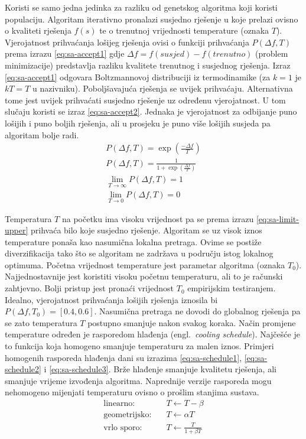 \documentclass[times, utf8, diplomski]{fer}
\begin{document}
Koristi se samo jedna jedinka za razliku od genetskog algoritma koji koristi populaciju. Algoritam iterativno pronalazi susjedno rješenje u koje prelazi ovisno o kvaliteti rješenja $f(s)$ te o trenutnoj vrijednosti temperature (oznaka $T$). Vjerojatnost prihvaćanja lošijeg rješenja ovisi o funkciji prihvaćanja $P(\Delta f, T)$ prema izrazu \ref{eq:sa-accept1} gdje $\Delta f=f(susjed)-f(trenutno)$ (problem minimizacije) predstavlja razliku kvalitete trenutnog i susjednog rješenja. Izraz \ref{eq:sa-accept1} odgovara Boltzmannovoj distribuciji iz termodinamike (za $k=1$ je $kT=T$ u nazivniku). Poboljšavajuća rješenja se uvijek prihvaćaju. Alternativna tome jest uvijek prihvaćati susjedno rješenje uz određenu vjerojatnost. U tom slučaju koristi se izraz \ref{eq:sa-accept2}. Jednaka je vjerojatnost za odbijanje puno lošijih i puno boljih rješenja, ali u prosjeku je puno više lošijih susjeda pa algoritam bolje radi.
%
\begin{gather}
	\label{eq:sa-accept1}
	P(\Delta f, T)=\exp(\frac{- \Delta f}{T}) \\
	\label{eq:sa-accept2}
	P(\Delta f, T)=\frac{1}{1 + \exp(\frac{\Delta f}{T})} \\
	\label{eq:sa-limit-upper}
	\lim_{T \to \infty} P(\Delta f, T)=1 \\
	\label{eq:sa-limit-lower}
	\lim_{T \to 0} P(\Delta f, T)=0
\end{gather}

Temperatura $T$ na početku ima visoku vrijednost pa se prema izrazu \ref{eq:sa-limit-upper} prihvaća bilo koje susjedno rješenje. Algoritam se uz visok iznos temperature ponaša kao nasumična lokalna pretraga. Ovime se postiže diverzifikacija tako što se algoritam ne zadržava u području istog lokalnog optimuma. Početna vrijednost temperature jest parametar algoritma (oznaka $T_{0}$). Najjednostavnije jest koristiti visoku početnu temperaturu, ali to je računski zahtjevno. Bolji pristup jest pronaći vrijednost $T_{0}$ empirijskim testiranjem. Idealno, vjerojatnost prihvaćanja lošijih rješenja iznosila bi $P(\Delta f, T_{0})=[0.4, 0.6]$. Nasumična pretraga ne dovodi do globalnog rješenja pa se zato temperatura $T$ postupno smanjuje nakon svakog koraka. Način promjene temperature određen je rasporedom hlađenja (engl.~\textit{cooling schedule}). Najčešće je to funkcija koja homogeno smanjuje temperaturu za malen iznos. Primjeri homogenih rasporeda hlađenja dani su izrazima \ref{eq:sa-schedule1}, \ref{eq:sa-schedule2} i \ref{eq:sa-schedule3}. Brže hlađenje smanjuje kvalitetu rješenja, ali smanjuje vrijeme izvođenja algoritma. Naprednije verzije rasporeda mogu nehomogeno mijenjati temperaturu ovisno o prošlim stanjima sustava.
%
\begin{align}
	\label{eq:sa-schedule1}
	\text{linearno:} \quad & T \leftarrow T - \beta \\
	\label{eq:sa-schedule2}
	\text{geometrijsko:} \quad & T \leftarrow \alpha T \\
	\label{eq:sa-schedule3}
	\text{vrlo sporo:} \quad & T \leftarrow \frac{T}{1 + \beta T}
\end{align}
\end{document}
